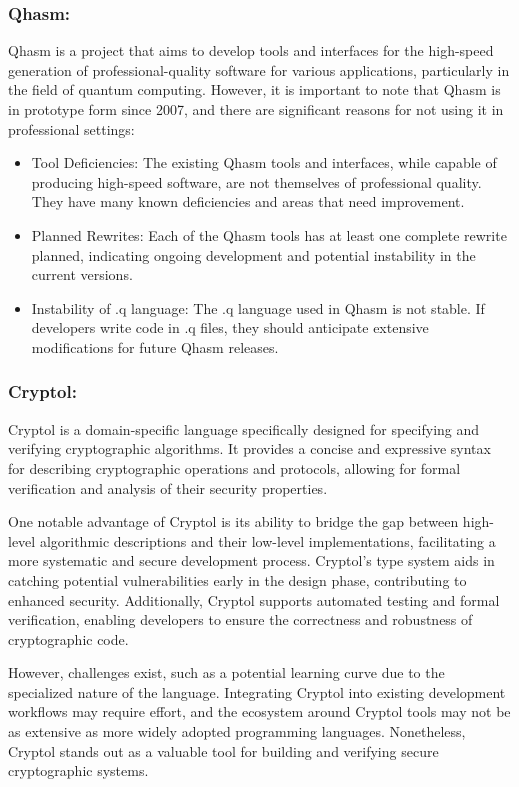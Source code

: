 \documentclass[runningheads]{llncs}
\begin{document}
\subsubsection{Qhasm:}
 Qhasm\cite{qhasm} is a project that aims to develop tools and interfaces for the high-speed generation of professional-quality software for various applications, particularly in the field of quantum computing.
However, it is important to note that Qhasm is in prototype form since 2007, and there are significant reasons for not using it in professional settings:
\begin{itemize}
    \item Tool Deficiencies: The existing Qhasm tools and interfaces, while capable of producing high-speed software, are not themselves of professional quality. They have many known deficiencies and areas that need improvement.
    \item Planned Rewrites: Each of the Qhasm tools has at least one complete rewrite planned, indicating ongoing development and potential instability in the current versions.
    \item Instability of .q language: The .q language used in Qhasm is not stable. If developers write code in .q files, they should anticipate extensive modifications for future Qhasm releases.
\end{itemize}


\subsubsection{Cryptol:} 
Cryptol\cite{cryptol} is a domain-specific language specifically designed for specifying and verifying cryptographic algorithms. It provides a concise and expressive syntax for describing cryptographic operations and protocols, allowing for formal verification and analysis of their security properties. 

One notable advantage of Cryptol is its ability to bridge the gap between high-level algorithmic descriptions and their low-level implementations, facilitating a more systematic and secure development process. Cryptol's type system aids in catching potential vulnerabilities early in the design phase, contributing to enhanced security. Additionally, Cryptol supports automated testing and formal verification, enabling developers to ensure the correctness and robustness of cryptographic code. 

However, challenges exist, such as a potential learning curve due to the specialized nature of the language. Integrating Cryptol into existing development workflows may require effort, and the ecosystem around Cryptol tools may not be as extensive as more widely adopted programming languages. Nonetheless, Cryptol stands out as a valuable tool for building and verifying secure cryptographic systems.
\end{document}
